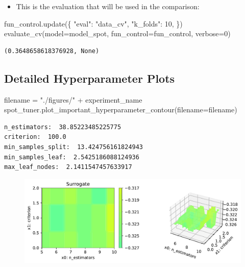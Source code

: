 \documentclass[
  letterpaper,
  DIV=11,
  numbers=noendperiod]{scrreprt}
\newenvironment{Shaded}{\begin{snugshade}}{\end{snugshade}}
\newcommand{\DecValTok}[1]{\textcolor[rgb]{0.68,0.00,0.00}{#1}}
\newcommand{\NormalTok}[1]{\textcolor[rgb]{0.00,0.23,0.31}{#1}}
\newcommand{\OperatorTok}[1]{\textcolor[rgb]{0.37,0.37,0.37}{#1}}
\newcommand{\StringTok}[1]{\textcolor[rgb]{0.13,0.47,0.30}{#1}}
\providecommand{\tightlist}{%
  \setlength{\itemsep}{0pt}\setlength{\parskip}{0pt}}\usepackage{longtable,booktabs,array}
\begin{document}
\begin{itemize}
\tightlist
\item
  This is the evaluation that will be used in the comparison:
\end{itemize}

\begin{Shaded}
\begin{Highlighting}[]
\NormalTok{fun\_control.update(\{}
     \StringTok{"eval"}\NormalTok{: }\StringTok{"data\_cv"}\NormalTok{,}
     \StringTok{"k\_folds"}\NormalTok{: }\DecValTok{10}\NormalTok{,}
\NormalTok{\})}
\NormalTok{evaluate\_cv(model}\OperatorTok{=}\NormalTok{model\_spot, fun\_control}\OperatorTok{=}\NormalTok{fun\_control, verbose}\OperatorTok{=}\DecValTok{0}\NormalTok{)}
\end{Highlighting}
\end{Shaded}

\begin{verbatim}
(0.3648658618376928, None)
\end{verbatim}

\hypertarget{detailed-hyperparameter-plots-3}{%
\subsection{Detailed Hyperparameter
Plots}\label{detailed-hyperparameter-plots-3}}

\begin{Shaded}
\begin{Highlighting}[]
\NormalTok{filename }\OperatorTok{=} \StringTok{"./figures/"} \OperatorTok{+}\NormalTok{ experiment\_name}
\NormalTok{spot\_tuner.plot\_important\_hyperparameter\_contour(filename}\OperatorTok{=}\NormalTok{filename)}
\end{Highlighting}
\end{Shaded}

\begin{verbatim}
n_estimators:  38.85223485225775
criterion:  100.0
min_samples_split:  13.424756161824943
min_samples_leaf:  2.5425186088124936
max_leaf_nodes:  2.1411547457633917
\end{verbatim}

\begin{figure}[H]

{\centering \includegraphics{16_spot_hpt_sklearn_multiclass_classification_randomforest_files/figure-pdf/cell-49-output-2.pdf}

}

\end{figure}
\end{document}

